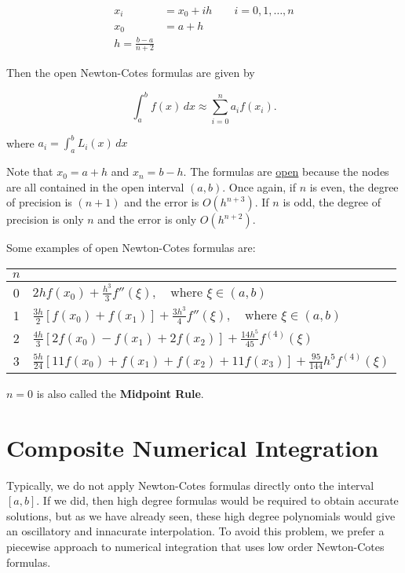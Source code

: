 \documentclass[12pt]{article}
\begin{document}
\begin{align*}
x_i &= x_0+ih \qquad i = 0,1,\dots,n \\
x_0 &= a+h \\
h = \frac{b-a}{n+2}
\end{align*}

Then the open Newton-Cotes formulas are given by

\begin{equation}
  \int_{a}^{b} f(x) \, dx \approx \sum_{i = 0}^{n} a_if(x_i) 
.\end{equation}

where $\displaystyle a_i = \int_{a}^{b} L_i(x) \, dx$

Note that $x_0 = a+h$ and $x_n = b-h$. The formulas are \uline{open} because the
nodes are all contained in the open interval $(a,b)$. Once again, if $n$ is even,
the degree of precision is $(n+1)$ and the error is $O(h^{n+3})$. If $n$ is odd,
the degree of precision is only $n$ and the error is only $O(h^{n+2})$.

Some examples of open Newton-Cotes formulas are:

\begin{tabular}{c| l}
    $n$ & \\
    \hline
    0 & $\displaystyle 2h f(x_0) + \frac{h^3}{3} f''(\xi), \quad \text{where } \xi \in (a,b)$ \\[10pt]
    1 & $\displaystyle \frac{3h}{2} \left[ f(x_0) + f(x_1) \right] + \frac{3h^3}{4} f''(\xi), \quad \text{where } \xi \in (a,b)$ \\[10pt]
    2 & $\displaystyle \frac{4h}{3} \left[ 2f(x_0) - f(x_1) + 2f(x_2) \right] + \frac{14h^5}{45} f^{(4)}(\xi)$ \\[10pt]
    3 & $\displaystyle \frac{5h}{24} \left[ 11f(x_0) + f(x_1) + f(x_2) + 11f(x_3) \right] + \frac{95}{144} h^5 f^{(4)}(\xi)$ \\
\end{tabular}

$n=0$ is also called the \textbf{Midpoint Rule}. 

\section{Composite Numerical Integration}
\label{sec:composite_numerical_integration}
Typically, we do not apply Newton-Cotes formulas directly onto the interval
$[a,b]$. If we did, then high degree formulas would be required to obtain
accurate solutions, but as we have already seen, these high degree polynomials
would give an oscillatory and innacurate interpolation. To avoid this problem,
we prefer a piecewise approach to numerical integration that uses low order
Newton-Cotes formulas.
\end{document}
